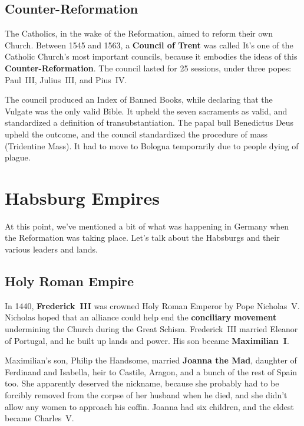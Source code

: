 \subsection*{Counter-Reformation}

The Catholics, in the wake of the Reformation, aimed to reform their own Church.
Between 1545 and 1563, a \textbf{Council of Trent} was called
It's one of the Catholic Church's most important councils,
because it embodies the ideas of this \textbf{Counter-Reformation}.
The council lasted for 25 sessions, under three popes: Paul~III, Julius~III, and Pius~IV\@.

The council produced an Index of Banned Books,
while declaring that the Vulgate was the only valid Bible.
It upheld the seven sacraments as valid,
and standardized a definition of transubstantiation.
The papal bull Benedictus Deus upheld the outcome,
and the council standardized the procedure of mass (Tridentine Mass).
It had to move to Bologna temporarily due to people dying of plague.

\section{Habsburg Empires}

At this point, we've mentioned a bit of what was happening in Germany when the Reformation was taking place.
Let's talk about the Habsburgs and their various leaders and lands.

\subsection*{Holy Roman Empire}

In 1440, \textbf{Frederick~III} was crowned Holy Roman Emperor by Pope Nicholas~V.
Nicholas hoped that an alliance could help end the \textbf{conciliary movement}
undermining the Church during the Great Schism.
Frederick~III married Eleanor of Portugal, and he built up lands and power.
His son became \textbf{Maximilian~I}.

Maximilian's son, Philip the Handsome, married \textbf{Joanna the Mad}, daughter of Ferdinand and Isabella,
heir to Castile, Aragon, and a bunch of the rest of Spain too.
She apparently deserved the nickname,
because she probably had to be forcibly removed from the corpse of her husband when he died,
and she didn't allow any women to approach his coffin.
Joanna had six children, and the eldest became Charles~V.

